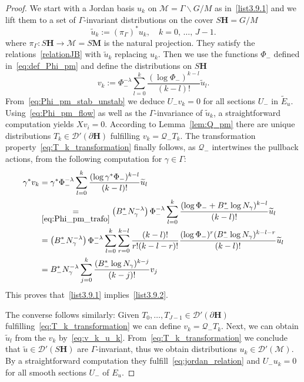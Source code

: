 \documentclass[10pt]{amsart}
\theoremstyle{definition}
\newcommand{\mc}{\mathcal}
\newcommand{\bfh}{\mathbf{H}}
\newcommand{\bfm}{\mathbf{M}}
\newcommand{\pl}{\partial}
\newcommand{\til}{\widetilde}
\begin{document}
\begin{proof}
We start with a Jordan basis $u_k$ on $\mc{M}=\Gamma\backslash G/M$ as in~\eqref{list3.9.1} and we lift them to a set of $\Gamma$-invariant distributions on the cover $S{\bfh}=G/M$
\begin{equation}\label{eq:jordan_relation}
\til u_k := (\pi_{\Gamma})^*u_k,\quad k= 0,\,\ldots,\,J-1.
\end{equation}
where $\pi_{\Gamma} : S{\bfh}\to \mc{M}= S{\bfm}$ is the natural projection. They satisfy the relations~\eqref{relationJB} with $\til{u}_k$ replacing $u_k$. Then we use the functions $\Phi_-$ defined in~\eqref{eq:def_Phi_pm} and define the distributions on $S{\bfh}$
\begin{equation}\label{eq:v_k_u_k}
v_k := \Phi_-^{-\lambda} \sum_{l=0}^k \frac{(\log \Phi_-)^{k-l}}{(k-l)!}\til u_l.
\end{equation}
From~\eqref{eq:Phi_pm_stab_unstab} we deduce $U_- v_k =0$ for all sections $U_-$ in $\til{E}_u$. Using~\eqref{eq:Phi_pm_flow} as well as the $\Gamma$-invariance of $\til u_k$, a straightforward computation yields $X v_i =0$. According to Lemma~\ref{lem:Q_pm} there are unique distributions $T_k\in \mathcal D'(\pl{\bfh})$ fulfilling $v_k = \mathcal Q_- T_k$. The transformation property~\eqref{eq:T_k_transformation} finally follows, as $\mathcal Q_-$ intertwines the pullback actions, from the following computation for $\gamma\in \Gamma$:
\begin{align*}
\gamma^*v_k &= \gamma^*\Phi_-^{-\lambda}\sum_{l=0}^k \frac{(\log \gamma^*\Phi_-)^{k-l}}{(k-l)!}\til u_l\\
&\underset{\eqref{eq:Phi_pm_trafo}}{=}\left(B_-^* N_\gamma^{-\lambda}\right) \Phi_-^{-\lambda}
\sum_{l=0}^k \frac{(\log \Phi_-+B_-^*\log N_\gamma)^{k-l}}{(k-l)!}\til u_l\\
&= \left(B_-^* N_\gamma^{-\lambda}\right)\Phi_-^{-\lambda}
\sum_{l=0}^k \sum_{r=0}^{k-l} \frac{(k-l)!}{r!(k-l-r)!}\frac{(\log \Phi_-)^r(B_-^*\log N_\gamma)^{k-l-r}}{(k-l)!}\til u_l\\
&=B_-^*N_\gamma^{-\lambda}\sum_{j=0}^k \frac{(B_-^*\log N_\gamma)^{k-j}}{(k-j)!}v_j
\end{align*}
This proves that~\eqref{list3.9.1} implies~\eqref{list3.9.2}.

The converse follows similarly: Given $T_0,\ldots, T_{J-1} \in \mathcal D'(\pl{\bfh})$ fulfilling~\eqref{eq:T_k_transformation} we can define $v_k = \mathcal Q_- T_k$. Next, we can obtain $\til u_l$ from the $v_k$ by~\eqref{eq:v_k_u_k}. From~\eqref{eq:T_k_transformation} we conclude that $\til u\in \mathcal D'(S{\bfh})$ are $\Gamma$-invariant, thus we obtain distributions $u_k\in \mathcal D'(\mc{M})$. By a straightforward computation they fulfill~\eqref{eq:jordan_relation} and $U_- u_k=0$ for all smooth sections $U_-$ of $E_u$.
\end{proof}
\end{document}
